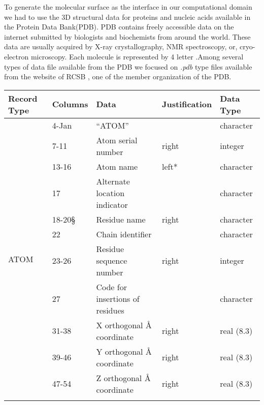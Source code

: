 To generate the molecular surface as the interface in our computational domain we had to use the 3D structural data for proteins and nucleic acids available in the Protein Data Bank(PDB). PDB contains freely accessible data on the internet submitted by biologists and biochemists from around the world. These data are usually acquired by  X-ray crystallography, NMR spectroscopy, or, cryo-electron microscopy. Each molecule is represented by 4 letter  .Among several types of data file available from the PDB we focused on \textit{.pdb} type files available from the website of RCSB \cite{RCSB}, one of the member organization of the PDB. 
\begin{table}[!ht]
\begin{tabular}{|l|l|l|l|l|}
\hline
Record Type             & Columns & Data                            & Justification & Data Type  \\ \hline
\multirow{15}{*}{ATOM}  & 4-Jan   & “ATOM”                          &               & character  \\ \cline{2-5} 
                        & 7-11  & Atom serial number              & right         & integer    \\ \cline{2-5} 
                        & 13-16   & Atom name                       & left*         & character  \\ \cline{2-5} 
                        & 17      & Alternate location indicator    &               & character  \\ \cline{2-5} 
                        & 18-20§  & Residue name                    & right         & character  \\ \cline{2-5} 
                        & 22      & Chain identifier                &               & character  \\ \cline{2-5} 
                        & 23-26   & Residue sequence number         & right         & integer    \\ \cline{2-5} 
                        & 27      & Code for insertions of residues &               & character  \\ \cline{2-5} 
                        & 31-38   & X orthogonal Å coordinate       & right         & real (8.3) \\ \cline{2-5} 
                        & 39-46   & Y orthogonal Å coordinate       & right         & real (8.3) \\ \cline{2-5} 
                        & 47-54   & Z orthogonal Å coordinate       & right         & real (8.3) \\ \cline{2-5} 

\end{tabular}
\end{table}
